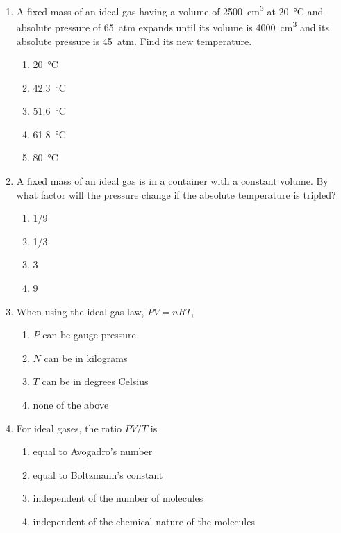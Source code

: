 \documentclass{../../../oss-apphys}
\begin{document}
\begin{multicols}{2}
\begin{enumerate}[leftmargin=18pt,start=24]
  \item A fixed mass of an ideal gas having a volume of \SI{2500}{cm^3} at
    \SI{20}{\celsius} and absolute pressure of \SI{65}{atm} expands until its
    volume is \SI{4000}{cm^3} and its absolute pressure is \SI{45}{atm}. Find
    its new temperature.
    \begin{enumerate}[noitemsep,topsep=0pt,leftmargin=18pt,label=(\Alph*)]
    \item\SI{20}{\celsius}
    \item\SI{42.3}{\celsius}
    \item\SI{51.6}{\celsius}
    \item\SI{61.8}{\celsius}
    \item\SI{80}{\celsius}
    \end{enumerate}

  \item A fixed mass of an ideal gas is in a container with a constant volume.
    By what factor will the pressure change if the absolute temperature is
    tripled?
    \begin{enumerate}[noitemsep,topsep=0pt,leftmargin=18pt,label=(\Alph*)]
    \item 1/9
    \item 1/3
    \item 3
    \item 9
    \end{enumerate}

  \item When using the ideal gas law, $PV=nRT$,
    \begin{enumerate}[noitemsep,topsep=0pt,leftmargin=18pt,label=(\Alph*)]
    \item $P$ can be gauge pressure
    \item $N$ can be in kilograms
    \item $T$ can be in degrees Celsius
    \item none of the above
    \end{enumerate}

    \columnbreak
    
  \item For ideal gases, the ratio $PV/T $ is
    \begin{enumerate}[noitemsep,topsep=0pt,leftmargin=18pt,label=(\Alph*)]
    \item equal to Avogadro's number
    \item equal to Boltzmann's constant
    \item independent of the number of molecules
    \item independent of the chemical nature of the molecules
    \end{enumerate}


\end{enumerate}
\end{multicols}
\end{document}

